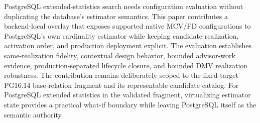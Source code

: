 PostgreSQL extended-statistics search needs configuration evaluation without
duplicating the database's estimator semantics.  This paper contributes a
backend-local overlay that exposes supported native MCV/FD configurations to
PostgreSQL's own cardinality estimator while keeping candidate realization,
activation order, and production deployment explicit.  The evaluation
establishes same-realization fidelity, contextual design behavior, bounded
advisor-work evidence, production-separated lifecycle closure, and bounded
DMV realization robustness.  The contribution remains deliberately scoped to
the fixed-target PG16.14 base-relation fragment and its representable
candidate catalog.  For PostgreSQL extended statistics in the validated
fragment, virtualizing estimator state provides a practical what-if boundary
while leaving PostgreSQL itself as the semantic authority.
